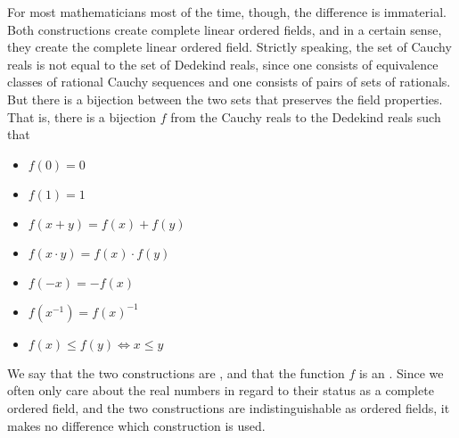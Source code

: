 \documentclass[letterpaper,10pt,english]{sphinxmanual}
\begin{document}
\sphinxAtStartPar
For most mathematicians most of the time, though, the difference is immaterial. Both constructions create complete linear ordered fields, and in a certain sense, they create the  complete linear ordered field. Strictly speaking, the set of Cauchy reals is not equal to the set of Dedekind reals, since one consists of equivalence classes of rational Cauchy sequences and one consists of pairs of sets of rationals. But there is a bijection between the two sets that preserves the field properties. That is, there is a bijection \(f\) from the Cauchy reals to the Dedekind reals such that
\begin{itemize}
\item {} 
\sphinxAtStartPar
\(f(0)=0\)

\item {} 
\sphinxAtStartPar
\(f(1)=1\)

\item {} 
\sphinxAtStartPar
\(f(x+y)=f(x)+f(y)\)

\item {} 
\sphinxAtStartPar
\(f(x \cdot y)=f(x) \cdot f(y)\)

\item {} 
\sphinxAtStartPar
\(f(-x)=-f(x)\)

\item {} 
\sphinxAtStartPar
\(f(x^{-1})=f(x)^{-1}\)

\item {} 
\sphinxAtStartPar
\(f(x) \leq f(y) \iff x \leq y\)

\end{itemize}

\sphinxAtStartPar
We say that the two constructions are , and that the function \(f\) is an . Since we often only care about the real numbers in regard to their status as a complete ordered field, and the two constructions are indistinguishable as ordered fields, it makes no difference which construction is used.
\end{document}
